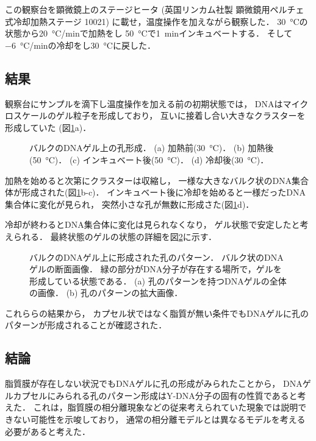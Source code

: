 この観察台を顕微鏡上のステージヒータ
(英国リンカム社製 顕微鏡用ペルチェ式冷却加熱ステージ 10021)
に載せ，温度操作を加えながら観察した．
\SI{30}{\celsius}の状態から\SI{20}{\celsius/min}で加熱をし
\SI{50}{\celsius}で\SI{1}{min}インキュベートする．
そして\SI{-6}{\celsius/min}の冷却をし\SI{30}{\celsius}に戻した．


\subsection{結果}
観察台にサンプルを滴下し温度操作を加える前の初期状態では，
DNAはマイクロスケールのゲル粒子を形成しており，
互いに接着し合い大きなクラスターを形成していた
(図\ref{fig:result_dnagel_formation}a)．%
\begin{figure}
    \centering
    
    \caption{バルクのDNAゲル上の孔形成．
        (a) 加熱前(\SI{30}{\celsius})．
        (b) 加熱後(\SI{50}{\celsius})．
        (c) インキュベート後(\SI{50}{\celsius})．
        (d) 冷却後(\SI{30}{\celsius})．
    }
    \label{fig:result_dnagel_formation}
\end{figure}
加熱を始めると次第にクラスターは収縮し，
一様な大きなバルク状のDNA集合体が形成された(図\ref{fig:result_dnagel_formation}b-c)．
インキュベート後に冷却を始めると一様だったDNA集合体に変化が見られ，
突然小さな孔が無数に形成さた(図\ref{fig:result_dnagel_formation}d)．

冷却が終わるとDNA集合体に変化は見られなくなり，
ゲル状態で安定したと考えられる．
最終状態のゲルの状態の詳細を図\ref{fig:result_dnagel}に示す．
\begin{figure}
    \centering
    
    \caption{バルクのDNAゲル上に形成された孔のパターン．
        バルク状のDNAゲルの断面画像．
        緑の部分がDNA分子が存在する場所で，ゲルを形成している状態である．
        (a) 孔のパターンを持つDNAゲルの全体の画像．
        (b) 孔のパターンの拡大画像．
    }
    \label{fig:result_dnagel}
\end{figure}

これららの結果から，
カプセル状ではなく脂質が無い条件でもDNAゲルに孔のパターンが形成されることが確認された．


\subsection{結論}
脂質膜が存在しない状況でもDNAゲルに孔の形成がみられたことから，
DNAゲルカプセルにみられる孔のパターン形成はY-DNA分子の固有の性質であると考えた．
これは，脂質膜の相分離現象などの従来考えられていた現象では説明できない可能性を示唆しており，
通常の相分離モデルとは異なるモデルを考える必要があると考えた．


